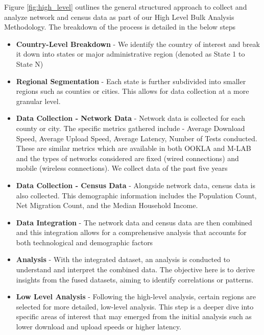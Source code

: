 \documentclass[conference]{IEEEtran}
\begin{document}
Figure \ref{fig:high_level} outlines the general structured approach to collect and analyze network and census data as part of our High Level Bulk Analysis Methodology. The breakdown of the process is detailed in the below steps

\begin{itemize}
    \item \textbf{Country-Level Breakdown} - We identify the country of interest and break it down into states or major administrative region (denoted as State 1 to State N)
    \item \textbf{Regional Segmentation} - Each state is further subdivided into smaller regions such as counties or cities. This allows for data collection at a more granular level.
    \item \textbf{Data Collection - Network Data} - Network data is collected for each county or city. The specific metrics gathered include - Average Download Speed, Average Upload Speed, Average Latency, Number of Tests conducted. These are similar metrics which are available in both OOKLA and M-LAB and the types of networks considered are fixed (wired connections) and mobile (wireless connections). We collect data of the past five years 
    \item \textbf{Data Collection - Census Data} - Alongside network data, census data is also collected. This demographic information includes the Population Count, Net Migration Count, and the Median Household Income.
    \item \textbf{Data Integration} - The network data and census data are then combined and this integration allows for a comprehensive analysis that accounts for both technological and demographic factors
    \item \textbf{Analysis} - With the integrated dataset, an analysis is conducted to understand and interpret the combined data. The objective here is to derive insights from the fused datasets, aiming to identify correlations or patterns. 
    \item \textbf{Low Level Analysis} - Following the high-level analysis, certain regions are selected for more detailed, low-level analysis. This step is a deeper dive into specific areas of interest that may emerged from the initial analysis such as lower download and upload speeds or higher latency.
\end{itemize}


\end{document}
